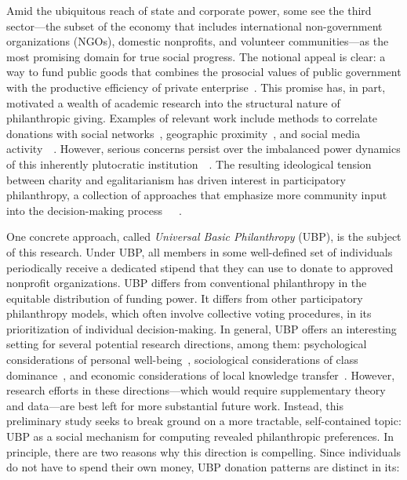 Amid the ubiquitous reach of state and corporate power, some see the third sector---the subset of the economy that includes international non-government organizations (NGOs), domestic nonprofits, and volunteer communities---as the most promising domain for true social progress.
The notional appeal is clear: a way to fund public goods that combines the prosocial values of public government with the productive efficiency of private enterprise~\cite{etzioni1973third}.
This promise has, in part, motivated a wealth of academic research into the structural nature of philanthropic giving.
Examples of relevant work include methods to correlate donations with social networks~\cite{apinunmahakul2008social}, geographic proximity~\cite{chapman2022give}, and social media activity~\cite{korolov2016predicting}~\cite{saxton2014social}.
However, serious concerns persist over the imbalanced power dynamics of this inherently plutocratic institution~\cite{maclean2021elite}~\cite{reich2020just}.
The resulting ideological tension between charity and egalitarianism has driven interest in participatory philanthropy, a collection of approaches that emphasize more community input into the decision-making process~\cite{meyer2021walking}~\cite{hauger2023nothing}~\cite{bhati2020literature}.

One concrete approach, called \emph{Universal Basic Philanthropy} (UBP), is the subject of this research.
Under UBP, all members in some well-defined set of individuals periodically receive a dedicated stipend that they can use to donate to approved nonprofit organizations.
UBP differs from conventional philanthropy in the equitable distribution of funding power.
It differs from other participatory philanthropy models, which often involve collective voting procedures, in its prioritization of individual decision-making.
In general, UBP offers an interesting setting for several potential research directions, among them: psychological considerations of personal well-being~\cite{anik2009feeling}, sociological considerations of class dominance~\cite{silver2007disentangling}, and economic considerations of local knowledge transfer~\cite{wandel2014nonprofit}.
However, research efforts in these directions---which would require supplementary theory and data---are best left for more substantial future work.
Instead, this preliminary study seeks to break ground on a more tractable, self-contained topic: UBP as a social mechanism for computing revealed philanthropic preferences.
In principle, there are two reasons why this direction is compelling. 
Since individuals do not have to spend their own money, UBP donation patterns are distinct in its:


